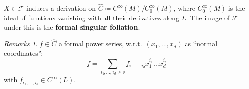 \documentclass[hyperref={pdfpagelabels=false}]{beamer}
\newcommand\insertreferences{}
\def\bes{\begin{equation*}}
\def\ees{\end{equation*}}
\theoremstyle{plain}
\theoremstyle{remark}
\newtheorem*{remark}{Remarks}
\begin{document}
\renewcommand\insertreferences{{\tiny Camille Laurent-Gengoux and Leonid Ryvkin, The neighborhood of a singular leaf, \newline \textit{Journal de l'École polytechnique}, Math. 8 (2021), 1037–1064.}}

\begin{frame}
\begin{definition}
$X \in \mathcal{F}$ induces a derivation on $\hat{C} \coloneqq C^\infty(M)/C^\infty_0(M)$, where $C^\infty_0(M)$ is the ideal of functions vanishing with all their derivatives along $L$. The image of $\mathcal{F}$ under this is the \textbf{formal singular foliation}.
\end{definition}

\begin{remark}
$f \in \hat{C}$ a formal power series, w.r.t.\ $(x_1, \dots, x_d)$ as ``normal coordinates'':
\bes
	f = \sum_{i_1, \dots, i_d \geq 0} f_{i_1, \dots, i_d} x^{i_1}_1 \dots x^{i_d}_d
\ees
with $f_{i_1, \dots, i_d} \in C^\infty(L)$.
\end{remark}

\end{frame}
\end{document}
